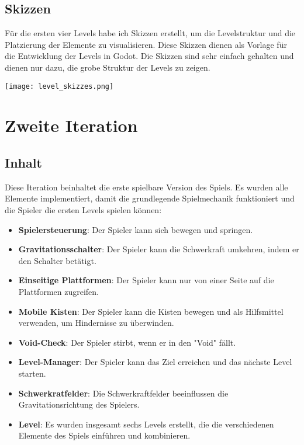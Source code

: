 \documentclass{article}
\begin{document}
\subsection{Skizzen}

Für die ersten vier Levels habe ich Skizzen erstellt, um die Levelstruktur und die Platzierung der Elemente zu visualisieren. Diese Skizzen dienen
als Vorlage für die Entwicklung der Levels in Godot. Die Skizzen sind sehr einfach gehalten und dienen nur dazu, die grobe Struktur der Levels zu zeigen.

\texttt{[image: level\_skizzes.png]}

\newpage
\section{Zweite Iteration}

\subsection{Inhalt}

Diese Iteration beinhaltet die erste spielbare Version des Spiels. Es wurden alle Elemente implementiert, damit die grundlegende Spielmechanik funktioniert
und die Spieler die ersten Levels spielen können:

\begin{itemize}
    \item \textbf{Spielersteuerung}: Der Spieler kann sich bewegen und springen.
    \item \textbf{Gravitationsschalter}: Der Spieler kann die Schwerkraft umkehren, indem er den Schalter betätigt.
    \item \textbf{Einseitige Plattformen}: Der Spieler kann nur von einer Seite auf die Plattformen zugreifen.
    \item \textbf{Mobile Kisten}: Der Spieler kann die Kisten bewegen und als Hilfsmittel verwenden, um Hindernisse zu überwinden.
    \item \textbf{Void-Check}: Der Spieler stirbt, wenn er in den "Void" fällt.
    \item \textbf{Level-Manager}: Der Spieler kann das Ziel erreichen und das nächste Level starten.
    \item \textbf{Schwerkratfelder}: Die Schwerkraftfelder beeinflussen die Gravitationsrichtung des Spielers.
    \item \textbf{Level}: Es wurden insgesamt sechs Levels erstellt, die die verschiedenen Elemente des Spiels einführen und kombinieren.
\end{itemize}
\end{document}
